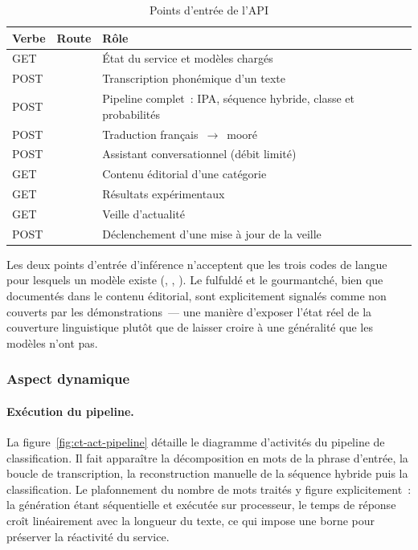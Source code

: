 \begin{table}[H]
	\centering
	\caption{Points d'entrée de l'API}
	\label{tab:ct-api}
	\begin{tabularx}{\textwidth}{@{} L{1.3cm} L{4.5cm} X @{}}
		\toprule
		\textbf{Verbe} & \textbf{Route} & \textbf{Rôle} \\
		\midrule
		GET  &                 & État du service et modèles chargés \\
		POST &                    & Transcription phonémique d'un texte \\
		POST &      & Pipeline complet~: IPA, séquence hybride, classe et probabilités \\
		POST &              & Traduction français~$\rightarrow$~mooré \\
		POST &                   & Assistant conversationnel (débit limité) \\
		GET  &      & Contenu éditorial d'une catégorie \\
		GET  &                & Résultats expérimentaux \\
		GET  &                   & Veille d'actualité \\
		POST &           & Déclenchement d'une mise à jour de la veille \\
		\bottomrule
	\end{tabularx}
\end{table}

Les deux points d'entrée d'inférence n'acceptent que les trois codes de langue pour
lesquels un modèle existe (, , ). Le fulfuldé et le
gourmantché, bien que documentés dans le contenu éditorial, sont explicitement
signalés comme non couverts par les démonstrations~--- une manière d'exposer l'état
réel de la couverture linguistique plutôt que de laisser croire à une généralité que
les modèles n'ont pas.

\subsubsection{Aspect dynamique}

\paragraph{Exécution du pipeline.}
La figure~\ref{fig:ct-act-pipeline} détaille le diagramme d'activités du pipeline de
classification. Il fait apparaître la décomposition en mots de la phrase d'entrée, la
boucle de transcription, la reconstruction manuelle de la séquence hybride puis la
classification. Le plafonnement du nombre de mots traités y figure explicitement~: la
génération étant séquentielle et exécutée sur processeur, le temps de réponse croît
linéairement avec la longueur du texte, ce qui impose une borne pour préserver la
réactivité du service.

